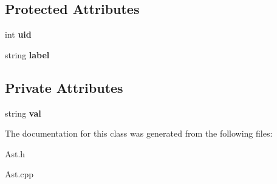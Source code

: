 \subsection*{Protected Attributes}
\begin{DoxyCompactItemize}
\item 
\hypertarget{classAST_a847b778f1c3dd5a19de32de432ee6e15}{int {\bfseries uid}}\label{classAST_a847b778f1c3dd5a19de32de432ee6e15}

\item 
\hypertarget{classAST_ab2e239ccc0688d2341724432ff5a1a31}{string {\bfseries label}}\label{classAST_ab2e239ccc0688d2341724432ff5a1a31}

\end{DoxyCompactItemize}
\subsection*{Private Attributes}
\begin{DoxyCompactItemize}
\item 
\hypertarget{classAstString_a6ea56d675adc723bd86ab5e8393db7c8}{string {\bfseries val}}\label{classAstString_a6ea56d675adc723bd86ab5e8393db7c8}

\end{DoxyCompactItemize}


The documentation for this class was generated from the following files\-:\begin{DoxyCompactItemize}
\item 
Ast.\-h\item 
Ast.\-cpp\end{DoxyCompactItemize}
